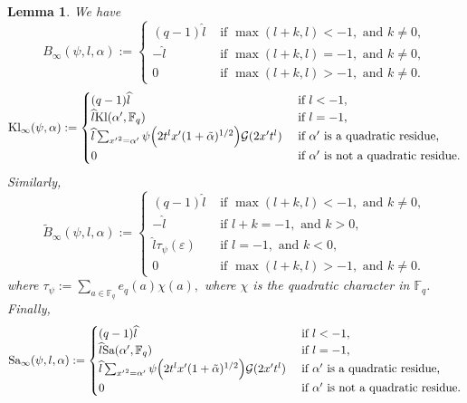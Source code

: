 \documentclass[11pt]{amsart}
\theoremstyle{plain}
\theoremstyle{plain}
\newtheorem{lemma}[theorem]{Lemma}
\theoremstyle{remark}
\theoremstyle{definition}
\newcommand{\hl}{\widehat l}
\newcommand{\Kl}{\textup{Kl}}
\newcommand{\Sa}{\textup{Sa}}
\newcommand{\FF}{\mathbb{F}}
\newcommand{\cG}{\mathcal{G}}
\begin{document}
\begin{lemma}
We have 
\[
B_{\infty}(\psi,l,\alpha):=\begin{cases} 
(q-1)\hl &\text{ if } \max(l+k,l)<-1, \text{ and } k\neq 0,
 \\
-\hl &\text{ if } \max(l+k,l)=-1, \text{ and } k\neq 0,
\\
0   &\text{ if } \max(l+k,l)>-1, \text{ and } k\neq 0. \end{cases}
\]
\[
\Kl_{\infty}(\psi,\alpha):=\begin{cases} 
(q-1)\hl &\text{ if } l<-1,
\\
\hl \Kl(\alpha^{\prime},\FF_q) &\text{ if } l=-1,
\\
\hl\sum_{{x^{\prime}}^2= \alpha^{\prime}}  \psi\Big(2t^{l}x^{\prime}(1+\tilde{\alpha})^{1/2} \Big) \cG(2x^{\prime}t^l)   &\text{ if } \alpha^{\prime} \text{ is a quadratic residue,}
\\
0   &\text{ if } \alpha^{\prime} \text{ is not a quadratic residue.} \end{cases}
\]
Similarly,  
\[
\widetilde{B}_{\infty}(\psi,l,\alpha):=\begin{cases} 
(q-1)\hl &\text{ if } \max(l+k,l)<-1, \text{ and } k\neq 0,
 \\
-\hl &\text{ if } l+k=-1, \text{ and } k> 0,
\\
\hl \tau_{\psi}(\varepsilon) &\text{ if } l=-1, \text{ and } k< 0,
\\
0   &\text{ if } \max(l+k,l)>-1, \text{ and } k\neq 0. \end{cases}
\]
where $\tau_{\psi}:=\sum_{a\in \FF_q}e_q(a)\chi(a),$ where $\chi$ is the quadratic character in $\FF_q$. Finally,
\[
\Sa_{\infty}(\psi,l,\alpha):=\begin{cases} 
(q-1)\hl &\text{ if } l<-1,
\\
\hl \Sa(\alpha^{\prime},\FF_q) &\text{ if } l=-1,
\\
\hl\sum_{{x^{\prime}}^2= \alpha^{\prime}}  \psi\Big(2t^{l}x^{\prime}(1+\tilde{\alpha})^{1/2} \Big) \cG(2x^{\prime}t^l)   &\text{ if } \alpha^{\prime} \text{ is a quadratic residue,}
\\
0   &\text{ if } \alpha^{\prime} \text{ is not a quadratic residue.} \end{cases}
\]
\end{lemma}
\end{document}
